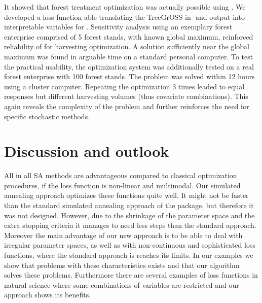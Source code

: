 It showed that forest treatment optimization was actually possible using . We developed a loss function able translating the TreeGrOSS in- and output into interpretable variables for . Sensitivity analysis using an exemplary forest enterprise comprised of 5 forest stands, with known global maximum, reinforced reliability of  for harvesting optimization. A solution sufficiently near the global maximum was found in arguable time on a standard personal computer. To test the practical usability, the optimization system was additionally tested on a real forest enterprise with 100 forest stands. The problem was solved within 12 hours using a cluster computer. Repeating the optimization 3 times leaded to equal responses but different harvesting volumes (thus covariate combinations). This again reveals the complexity of the problem and further reinforces the need for specific stochastic methods.

\section{Discussion and outlook}
All in all SA methods are advantageous compared to classical optimization procedures, if the loss function is non-linear and multimodal. Our simulated annealing approach optimizes these functions quite well. It might not be faster than the standard simulated annealing approach of the  package, but therefore it was not designed. However, due to the shrinkage of the parameter space and the extra stopping criteria it manages to need less steps than the standard approach. Moreover the main advantage of our new approach is to be able to deal with irregular parameter spaces, as well as with non-continuous and sophisticated loss functions, where the standard approach is reaches its limits. In our examples we show that problems with these characteristics exists and that our algorithm solves these problems. Furthermore there are several examples of loss functions in natural science where some combinations of variables are restricted and our approach shows its benefits.



\address{Author One\\
    Affiliation\\
    Address\\
    Country\\}

\address{Author Two\\
    Affiliation\\
    Address\\
    Country\\}

\address{Author Three\\
    Affiliation\\
    Address\\
    Country\\}
